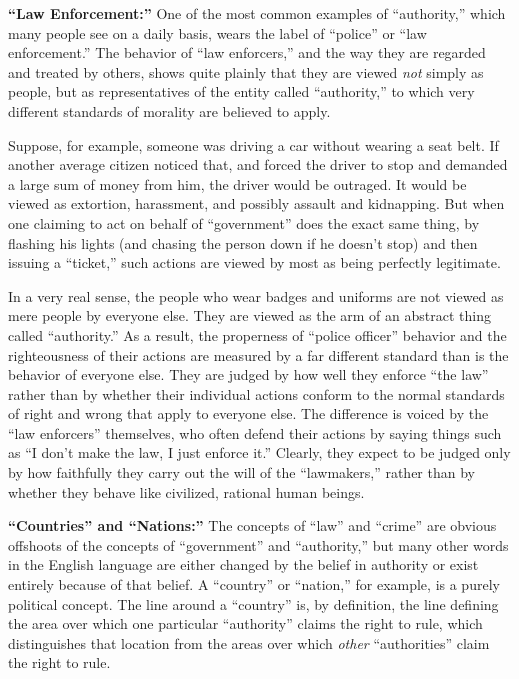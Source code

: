 \documentclass{book}
\begin{document}
\textbf{\enquote{Law Enforcement:}} One of the most common examples of \enquote{authority,} which many people see on a daily basis, wears the label of \enquote{police} or \enquote{law enforcement.} The behavior of \enquote{law enforcers,} and the way they are regarded and treated by others, shows quite plainly that they are viewed \emph{not} simply as people, but as representatives of the entity called \enquote{authority,} to which very different standards of morality are believed to apply.

Suppose, for example, someone was driving a car without wearing a seat belt. If another average citizen noticed that, and forced the driver to stop and demanded a large sum of money from him, the driver would be outraged. It would be viewed as extortion, harassment, and possibly assault and kidnapping. But when one claiming to act on behalf of \enquote{government} does the exact same thing, by flashing his lights (and chasing the person down if he doesn't stop) and then issuing a \enquote{ticket,} such actions are viewed by most as being perfectly legitimate.

In a very real sense, the people who wear badges and uniforms are not viewed as mere people by everyone else. They are viewed as the arm of an abstract thing called \enquote{authority.} As a result, the properness of \enquote{police officer} behavior and the righteousness of their actions are measured by a far different standard than is the behavior of everyone else. They are judged by how well they enforce \enquote{the law} rather than by whether their individual actions conform to the normal standards of right and wrong that apply to everyone else. The difference is voiced by the \enquote{law enforcers} themselves, who often defend their actions by saying things such as \enquote{I don't make the law, I just enforce it.} Clearly, they expect to be judged only by how faithfully they carry out the will of the \enquote{lawmakers,} rather than by whether they behave like civilized, rational human beings.

\textbf{\enquote{Countries} and \enquote{Nations:}} The concepts of \enquote{law} and \enquote{crime} are obvious offshoots of the concepts of \enquote{government} and \enquote{authority,} but many other words in the English language are either changed by the belief in authority or exist entirely because of that belief. A \enquote{country} or \enquote{nation,} for example, is a purely political concept. The line around a \enquote{country} is, by definition, the line defining the area over which one particular \enquote{authority} claims the right to rule, which distinguishes that location from the areas over which \emph{other} \enquote{authorities} claim the right to rule.
\end{document}
